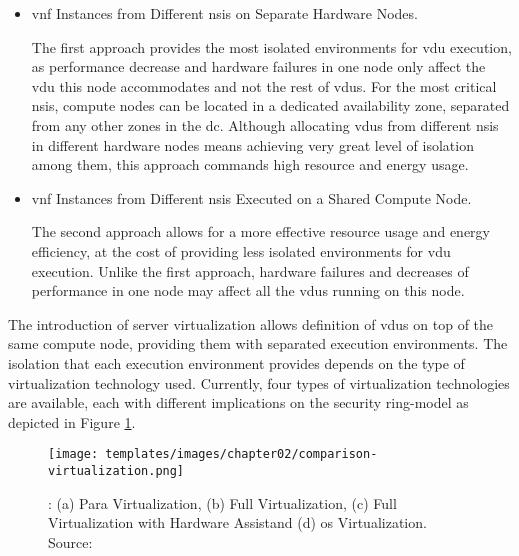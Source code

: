 \begin{enumerate}
        \begin{itemize}
        \item \acrshort{vnf} Instances from Different \acrshort{nsi}s on Separate Hardware Nodes.
        
        The first approach provides the most isolated environments for \acrshort{vdu} execution, as performance decrease and hardware failures in one node only affect the \acrshort{vdu} this node accommodates and not the rest of \acrshort{vdu}s. For the most critical \acrshort{nsi}s, compute nodes can be located in a dedicated availability zone, separated from any other zones in the \acrshort{dc}. Although allocating \acrshort{vdu}s from different \acrshort{nsi}s in different hardware nodes means achieving very great level of isolation among them, this approach commands high resource and energy usage.
        
        \item \acrshort{vnf} Instances from Different \acrshort{nsi}s Executed on a Shared Compute Node.
        
        The second approach allows for a more effective resource usage and energy efficiency, at the cost of providing less isolated environments for \acrshort{vdu} execution. Unlike the first approach, hardware failures and decreases of performance in one node may affect all the \acrshort{vdu}s running on this node.
        \end{itemize}

\newpage

        The introduction of server virtualization allows definition of \acrshort{vdu}s on top of the same compute node, providing them with separated execution environments. The isolation that each execution environment provides depends on the type of virtualization technology used. Currently, four types of virtualization technologies are available, each with different implications on the security ring-model as depicted in Figure \ref{fig:comparison-virtualization}. 
        
        \begin{figure}[!ht]
            \centering
            \texttt{[image: templates/images/chapter02/comparison-virtualization.png]}
            \caption[Comparison of Server Virtualization Technologies]{: (a) Para Virtualization, (b) Full Virtualization, (c) Full Virtualization with Hardware Assist\protect\footnotemark and (d) \acrshort{os} Virtualization. Source: \cite{adrian_gallego_2019_2668763}}
            \label{fig:comparison-virtualization}
        \end{figure}


\end{enumerate}
